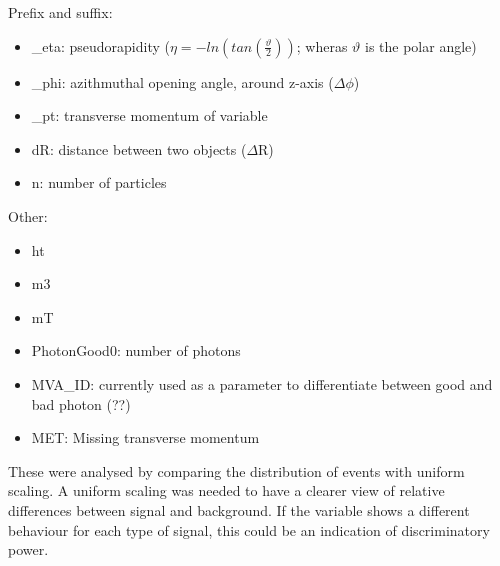 \documentclass[11pt]{scrartcl}
\begin{document}
Prefix and suffix:
\begin{itemize}
	  \item \_eta: pseudorapidity ($\eta = -ln(tan(\frac{\vartheta}{2}))$; wheras $\vartheta$ is the polar angle)
	  \item \_phi: azithmuthal opening angle, around z-axis ($\Delta\phi$)
	  \item \_pt: transverse momentum of variable
	  \item dR: distance between two objects ($\Delta$R)
	  \item n: number of particles
\end{itemize}

Other:
\begin{itemize}
  \item ht
  \item m3
  \item mT
  \item PhotonGood0: number of photons
  \item MVA\_ID: currently used as a parameter to differentiate between good and bad photon (??)
  \item MET: Missing transverse momentum
\end{itemize}

These were analysed by comparing the distribution of events with uniform scaling. A uniform scaling was needed to have a clearer view of relative differences between signal and background. If the variable shows a different behaviour for each type of signal, this could be an indication of discriminatory power. 
\end{document}
